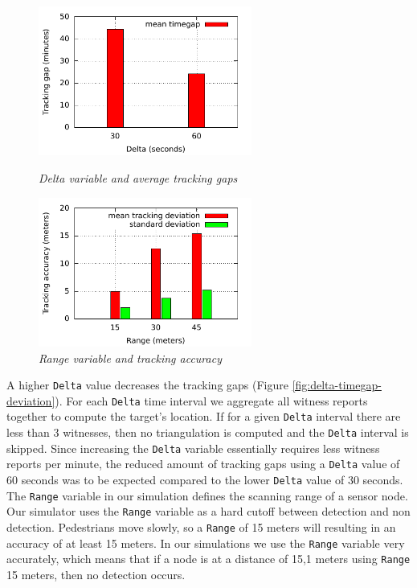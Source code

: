 \documentclass[10pt,titlepage]{article}
\begin{document}
\begin{figure}[t]
\begin{minipage}[b]{0.45\linewidth}
\centering
\includegraphics[width=7cm]{delta-timegap-total.pdf}
\caption{\textit{Delta variable and average tracking gaps}}
\label{fig:delta-timegap-deviation}
\end{minipage}
\hspace{0.5cm}
\begin{minipage}[b]{0.45\linewidth}
\centering
\includegraphics[width=7cm]{range-deviation-total.pdf}
\caption{\textit{Range variable and tracking accuracy}}
\label{fig:range-deviation}

\end{minipage}
\end{figure}

A higher \texttt{Delta} value decreases the tracking gaps (Figure \ref{fig:delta-timegap-deviation}). For each \texttt{Delta} time interval we aggregate all witness reports together to compute the target's location. If for a given \texttt{Delta} interval there are less than 3 witnesses, then no triangulation is computed and the \texttt{Delta} interval is skipped. Since increasing the \texttt{Delta} variable essentially requires less witness reports per minute, the reduced amount of tracking gaps using a \texttt{Delta} value of 60 seconds was to be expected compared to the lower \texttt{Delta} value of 30 seconds.\\


The \texttt{Range} variable in our simulation defines the scanning range of a sensor node. Our simulator uses the \texttt{Range} variable as a hard cutoff between detection and non detection. Pedestrians move slowly, so a \texttt{Range} of 15 meters will resulting in an accuracy of at least 15 meters. In our simulations we use the \texttt{Range} variable very accurately, which means that if a node is at a distance of 15,1 meters using \texttt{Range} 15 meters, then no detection occurs.\\
\end{document}
